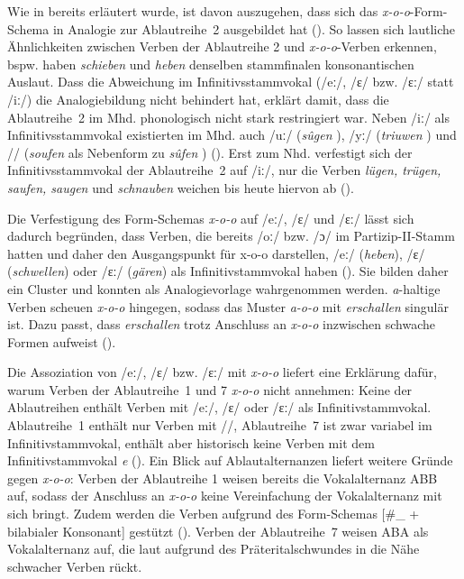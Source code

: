 Wie in  bereits erläutert wurde, ist davon auszugehen, dass sich das \textit{x-o-o}-Form-Schema in Analogie zur Ablautreihe~2 ausgebildet hat (\cite[166]{Nowak.2018}). So lassen sich lautliche Ähnlichkeiten zwischen Verben der Ablautreihe 2 und \textit{x-o-o}-Verben erkennen, bspw. haben \textit{schieben} und \textit{heben} denselben stamm\-fi\-nalen konsonantischen Auslaut. Dass die Abweichung im Infinitivsstammvokal (/eː/, /ɛ/ bzw. /ɛː/ statt /iː/) die Analogiebildung nicht behindert hat, erklärt \textcite[165--166]{Nowak.2018} damit, dass die Ablautreihe~2 im Mhd. phonologisch nicht stark restringiert war. Neben /iː/ als Infinitivsstammvokal existierten im Mhd. auch /uː/ (\textit{sûgen} ), /yː/ (\textit{triuwen} ) und /{}/ (\textit{soufen} als Nebenform zu \textit{sûfen} ) (\cite[233]{Nowak.2015}). Erst zum Nhd. verfestigt sich der Infinitivsstamm\-vokal der Ablautreihe~2 auf /iː/, nur die Verben \textit{lügen, trügen, saufen, saugen} und \textit{schnauben} weichen bis heute hiervon ab (\cites[233]{Nowak.2015}[169]{Nowak.2018}).



 Die Verfestigung des Form-Schemas \textit{x-o-o} auf /eː/, /ɛ/ und /ɛː/   lässt sich dadurch begründen, dass Verben, die bereits /oː/ bzw. /ɔ/ im Partizip-II-Stamm hatten und daher den Ausgangspunkt für x-o-o darstellen, /eː/ (\textit{heben}), /ɛ/ (\textit{schwellen}) oder /ɛː/ (\textit{gären}) als Infinitivstammvokal haben (\cite[266--267]{Nowak.2015}). Sie bilden daher ein Cluster und konnten als Analogievorlage wahrgenommen werden. \textit{a}-haltige Verben scheuen \textit{x-o-o} hingegen, sodass das  Muster \textit{a-o-o} mit \textit{erschallen} singulär ist. Dazu passt, dass \textit{erschallen} trotz Anschluss an \textit{x-o-o} inzwischen schwache Formen aufweist (\cite[272]{Nowak.2015}). 

Die Assoziation von /eː/, /ɛ/ bzw. /ɛː/ mit \textit{x-o-o} liefert eine Erklärung dafür, warum Verben der Ablaut\-reihe~1 und 7 \textit{x-o-o} nicht annehmen: Keine der Ablautreihen enthält Verben mit /eː/, /ɛ/ oder /ɛː/ als Infinitivstammvokal. Ablautreihe~1 enthält nur Verben mit /{}/, Ablautreihe~7 ist zwar variabel im Infinitivstamm\-vokal, enthält aber historisch keine Verben mit dem Infinitivstammvokal \textit{e} (\cite[399--404]{Braune.2018}). Ein Blick auf Ablautalternanzen liefert weitere Gründe gegen \textit{x-o-o}: Verben der Ablautreihe 1 weisen bereits die Vokalalternanz ABB auf, sodass der Anschluss an \textit{x-o-o} keine Vereinfachung der Vokalalternanz mit sich bringt. Zudem werden die Verben aufgrund des Form-Schemas [\#\_{} + bilabialer Konsonant] gestützt (\cite[171]{Nowak.2018}). Verben der Ablautreihe~7 weisen ABA als Vokalalternanz auf, die laut \textcite[141]{Nowak.2016} aufgrund des Präteritalschwundes in die Nähe schwacher Verben rückt.

